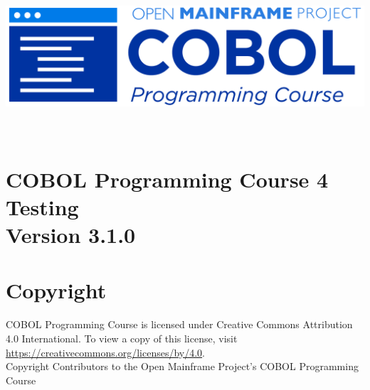 \begin{center}
  \vspace*{25pt}
\includegraphics{Images/COBOL-Programming-Course.png}
\hypertarget{cobol-programming-course-4}{%
\section*{
  \\[35pt]
  \Huge COBOL Programming Course 4 \\[10pt]
  \Huge Testing \\[15pt]
  \Large Version 3.1.0}\label{cobol-programming-course-3}}
\end{center}

\pagebreak
\hypertarget{copyright}{%
\section*{Copyright}{
  \normalsize COBOL Programming Course is licensed under Creative Commons 
  Attribution 4.0 International. To view a copy of this license, visit 
  \href{https://creativecommons.org/licenses/by/4.0}{https://creativecommons.org/licenses/by/4.0}. \\[10pt]
  Copyright Contributors to the Open Mainframe Project's COBOL Programming Course}\label{copyright}}
\pagebreak